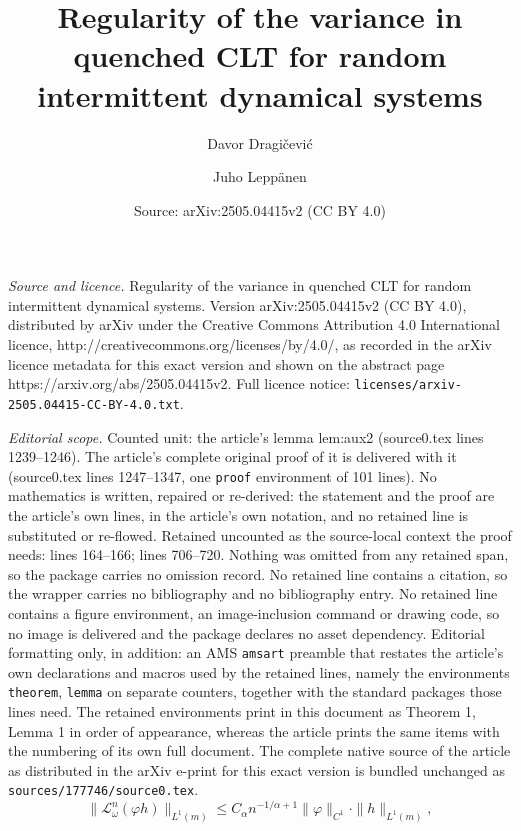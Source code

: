 \documentclass[10pt,a4paper]{amsart}
\title{Regularity of the variance in quenched CLT for random intermittent dynamical systems}
\author{Davor Dragi\v cevi\' c \and Juho Lepp{\"a}nen}
\date{Source: arXiv:2505.04415v2 (CC BY 4.0)}
\begin{document}
\maketitle

\noindent\emph{Source and licence.} Regularity of the variance in quenched CLT for random intermittent dynamical systems. Version arXiv:2505.04415v2 (CC BY 4.0), distributed by arXiv under the Creative Commons Attribution 4.0 International licence, http://creativecommons.org/licenses/by/4.0/, as recorded in the arXiv licence metadata for this exact version and shown on the abstract page https://arxiv.org/abs/2505.04415v2. Full licence notice: \texttt{licenses/arxiv-2505.04415-CC-BY-4.0.txt}.\par\smallskip

\noindent\textit{Editorial scope.} Counted unit: the article's lemma lem:aux2 (source0.tex lines 1239--1246). The article's complete original proof of it is delivered with it (source0.tex lines 1247--1347, one \texttt{proof} environment of 101 lines). No mathematics is written, repaired or re-derived: the statement and the proof are the article's own lines, in the article's own notation, and no retained line is substituted or re-flowed.  Retained uncounted as the source-local context the proof needs: lines 164--166; lines 706--720.  Nothing was omitted from any retained span, so the package carries no omission record.  No retained line contains a citation, so the wrapper carries no bibliography and no bibliography entry.  No retained line contains a figure environment, an image-inclusion command or drawing code, so no image is delivered and the package declares no asset dependency.  Editorial formatting only, in addition: an AMS \texttt{amsart} preamble that restates the article's own declarations and macros used by the retained lines, namely the environments \texttt{theorem}, \texttt{lemma} on separate counters, together with the standard packages those lines need.  The retained environments print in this document as Theorem 1, Lemma 1 in order of appearance, whereas the article prints the same items with the numbering of its own full document.  The complete native source of the article as distributed in the arXiv e-print for this exact version is bundled unchanged as \texttt{sources/177746/source0.tex}.
		\begin{equation}\label{dec}
			\|\mathcal L_\omega^n (\varphi h)\|_{L^1(m)} \le C_\alpha n^{-1/\alpha+1}\|\varphi \|_{C^1} \cdot \|h\|_{L^1(m)},
		\end{equation}
\end{document}

